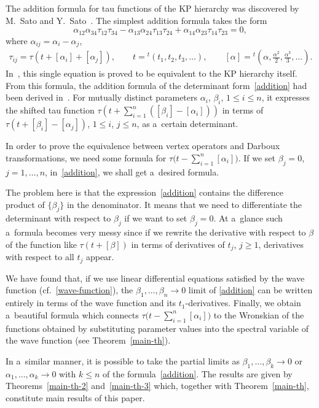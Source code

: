 \documentclass[pdftex]{sigma}
\numberwithin{equation}{section}
\theoremstyle{definition}
\begin{document}
The addition formula for tau functions of the KP hierarchy was discovered by M.~Sato and Y.~Sato~\cite{SS}. The simplest addition formula takes the form
\[
\alpha_{12}\alpha_{34}
\tau_{12}\tau_{34}
-
\alpha_{13}\alpha_{24}\tau_{13}\tau_{24}
+
\alpha_{14}\alpha_{23}\tau_{14}\tau_{23}
=0,
\]
where $\alpha_{ij}=\alpha_i-\alpha_j$,
\begin{gather*}
\tau_{ij}=\tau(t+[\alpha_i]+[\alpha_j]),
\qquad
t={}^t(t_1,t_2,t_3,\dots ),
\qquad
[\alpha]={}^t\left(\alpha,\frac{\alpha^2}{2},\frac{\alpha^3}{3},\dots \right).
\end{gather*}
In~\cite{Shigyo2013,Takasaki-Takebe1995}, this single equation is proved to be equivalent to the
KP hierarchy itself. From this formula, the addition formula of the determinant form~\eqref{addition} had been derived in~\cite{Shigyo2013}.
For mutually distinct parameters $\alpha_i$, $\beta_i$, $1\leq i\leq n$, it expresses
the shifted tau function $ \tau(t+\sum_{i=1}^n([\beta_i]-[\alpha_i]))$ in terms of $\tau(t+[\beta_i]-[\alpha_j])$, $1\leq i$, $j\leq n$, as a~certain determinant.

In order to prove the equivalence between vertex operators and Darboux
transformations, we need some formula for
$ \tau\bigl(t-\sum_{i=1}^n[\alpha_i]\bigr)$.
If we set $\beta_j=0$, $j=1,\dots ,n$, in~\eqref{addition}, we shall get a~desired formula.

The problem here is that the expression~\eqref{addition} contains
the difference product of $\{\beta_j\}$ in the denominator.
It means that we need to differentiate the determinant with respect to $\beta_j$ if we want to set
$\beta_j=0$. At a~glance such a~formula becomes very messy since if we rewrite the derivative
with respect to $\beta$ of the function like $\tau(t+[\beta])$ in terms of
 derivatives of $t_j$, $j\geq 1$,
derivatives with respect to all $t_j$ appear.

We have found that, if we use linear differential equations satisfied
by the wave function (cf.~\eqref{wave-function}), the
$\beta_1,\dots ,\beta_n\to 0$ limit of
 \eqref{addition} can be written
entirely in terms of the wave function and its $t_1$-derivatives.
Finally, we obtain a~beautiful formula which connects $ \tau\bigl(t-\sum_{i=1}^n[\alpha_i]\bigr)$ to the Wronskian of the functions obtained by substituting parameter values into the spectral variable
of the wave function (see Theorem~\ref{main-th}).

In a~similar manner, it is possible to take
the partial limits as
$\beta_1,\dots ,\beta_k\to 0$ or $\alpha_1,\dots ,\alpha_k\to 0$ with $k\leq n$ of
the formula~\eqref{addition}.
The results are given by Theorems~\ref{main-th-2} and~\ref{main-th-3} which, together with Theorem~\ref{main-th}, constitute main results of this paper.
\end{document}
